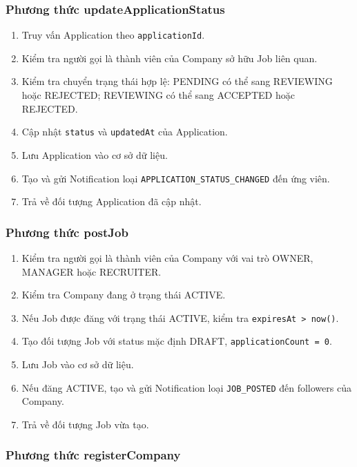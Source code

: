 \subsubsection{Phương thức updateApplicationStatus}

\begin{enumerate}
    \item Truy vấn Application theo \texttt{applicationId}.
    \item Kiểm tra người gọi là thành viên của Company sở hữu Job liên quan.
    \item Kiểm tra chuyển trạng thái hợp lệ: PENDING có thể sang REVIEWING hoặc REJECTED; REVIEWING có thể sang ACCEPTED hoặc REJECTED.
    \item Cập nhật \texttt{status} và \texttt{updatedAt} của Application.
    \item Lưu Application vào cơ sở dữ liệu.
    \item Tạo và gửi Notification loại \texttt{APPLICATION\_STATUS\_CHANGED} đến ứng viên.
    \item Trả về đối tượng Application đã cập nhật.
\end{enumerate}

\subsubsection{Phương thức postJob}

\begin{enumerate}
    \item Kiểm tra người gọi là thành viên của Company với vai trò OWNER, MANAGER hoặc RECRUITER.
    \item Kiểm tra Company đang ở trạng thái ACTIVE.
    \item Nếu Job được đăng với trạng thái ACTIVE, kiểm tra \texttt{expiresAt > now()}.
    \item Tạo đối tượng Job với status mặc định DRAFT, \texttt{applicationCount = 0}.
    \item Lưu Job vào cơ sở dữ liệu.
    \item Nếu đăng ACTIVE, tạo và gửi Notification loại \texttt{JOB\_POSTED} đến followers của Company.
    \item Trả về đối tượng Job vừa tạo.
\end{enumerate}

\subsubsection{Phương thức registerCompany}

